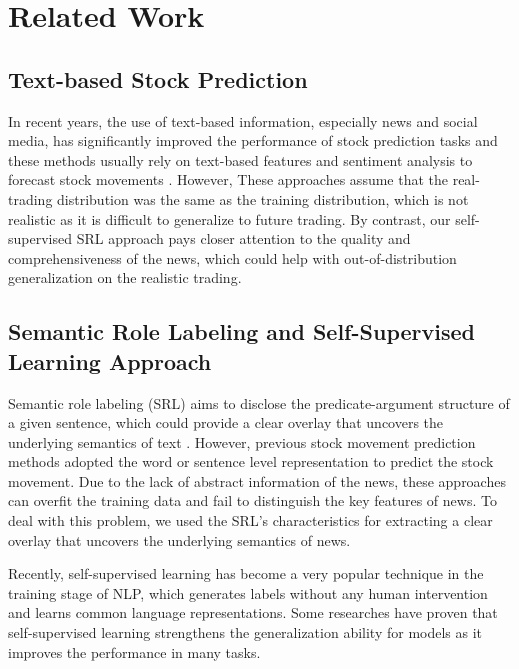 \documentclass{article}
\begin{document}
\section{Related Work}

\subsection{Text-based Stock Prediction}
In recent years, the use of text-based information, especially news and social media, has significantly improved the performance of stock prediction tasks and these methods usually rely on text-based features and sentiment analysis to forecast stock movements \cite{xu-cohen-2018-stock,hu2018listening,ding2015deep}. However, These approaches assume that the real-trading distribution was the same as the training distribution, which is not realistic as it is difficult to generalize to future trading. By contrast, our self-supervised SRL approach pays closer attention to the quality and comprehensiveness of the news, which could help with out-of-distribution generalization on the realistic trading.    




\subsection{Semantic Role Labeling and Self-Supervised Learning Approach}
Semantic role labeling (SRL) aims to disclose the predicate-argument structure of a given sentence, which could provide a clear overlay that uncovers the underlying semantics of text \cite{conia2021invero}. 
However, previous stock movement prediction methods \cite{xu-cohen-2018-stock,hu2018listening,ding2015deep} adopted the word or sentence level representation to predict the stock movement. Due to the lack of abstract information of the news, these approaches can overfit the training data and fail to distinguish the key features of news. To deal with this problem, we used the SRL's characteristics for extracting a clear overlay that uncovers the underlying semantics of news. \par


Recently, self-supervised learning has become a very popular technique in the training stage of NLP, which generates labels without any human intervention and learns common language representations. Some researches  \cite{im-etal-2021-self,zheng2021self} have proven that self-supervised learning strengthens the generalization ability for models as it improves the performance in many tasks.
\end{document}
